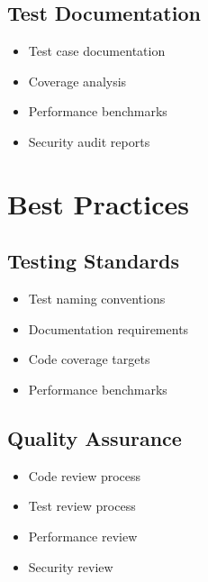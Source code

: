 \documentclass{article}
\begin{document}
\subsection{Test Documentation}
\begin{itemize}
    \item Test case documentation
    \item Coverage analysis
    \item Performance benchmarks
    \item Security audit reports
\end{itemize}

\section{Best Practices}

\subsection{Testing Standards}
\begin{itemize}
    \item Test naming conventions
    \item Documentation requirements
    \item Code coverage targets
    \item Performance benchmarks
\end{itemize}

\subsection{Quality Assurance}
\begin{itemize}
    \item Code review process
    \item Test review process
    \item Performance review
    \item Security review
\end{itemize}
\end{document}

